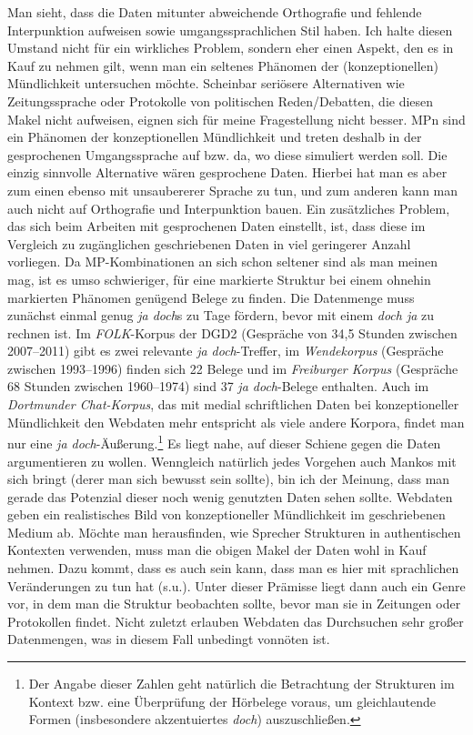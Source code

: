 Man sieht, dass die Daten mitunter abweichende Orthografie und fehlende Interpunktion aufweisen sowie umgangssprachlichen Stil haben. Ich halte diesen Umstand nicht für ein wirkliches Problem, sondern eher einen Aspekt, den es in Kauf zu nehmen gilt, wenn man ein seltenes Phänomen der (konzeptionellen) Mündlichkeit untersuchen möchte. Scheinbar \glq seriösere\grq {} Alternativen wie Zei\-tungssprache oder Protokolle von politischen Reden/Debatten, die diesen \glq Makel\grq {} nicht aufweisen, eignen sich für meine Fragestellung nicht besser. MPn sind ein Phäno\-men der konzeptionellen Mündlichkeit und treten deshalb in der gesprochenen Umgangs\-sprache auf bzw. da, wo diese simuliert werden soll. Die einzig sinn\-volle Alternative wären gesprochene Daten. Hierbei hat man es aber zum einen ebenso mit \glq unsaubererer\grq {} Sprache zu tun, und zum anderen kann man auch nicht auf Orthografie und Interpunktion bauen. Ein zusätzliches Problem, das sich beim Arbeiten mit gesprochenen Daten einstellt, ist, dass diese im Ver\-gleich zu zugängli\-chen geschriebenen Daten in viel geringerer Anzahl vorliegen. Da MP-Kombina\-tionen an sich schon seltener sind als man meinen mag, ist es umso schwieriger, für eine markierte Struktur bei einem ohnehin markierten Phänomen genügend Belege zu finden. Die Datenmenge muss zunächst einmal genug \textit{ja doch}s zu Tage fördern, bevor mit einem \textit{doch ja} zu rechnen ist. Im \textit{FOLK}-Korpus der DGD2 (Gespräche von 34,5 Stunden zwischen 2007–2011) gibt es zwei relevante \textit{ja doch}-Treffer, im \textit{Wendekorpus} (Gespräche zwischen 1993–1996) finden sich 22 Belege und im \textit{Freiburger Korpus} (Gespräche 68 Stunden zwischen 1960–1974) sind 37 \textit{ja doch}-Belege enthalten. Auch im \textit{Dortmunder Chat-Korpus}, das mit medial schriftlichen Daten bei konzeptioneller Mündlichkeit den Webdaten mehr entspricht als viele andere Korpora, findet man nur eine \textit{ja doch}-Äußerung.\footnote{Der Angabe dieser Zahlen geht natürlich die Betrachtung der Strukturen im Kontext bzw. eine Überprüfung der Hörbelege voraus, um gleichlautende Formen (insbesondere akzentuiertes \textit{doch}) auszuschließen.} Es liegt nahe, auf dieser Schiene gegen die Daten argumentieren zu wollen. Wenngleich natürlich jedes Vorgehen auch Mankos mit sich bringt (derer man sich bewusst sein sollte), bin ich der Meinung, dass man gerade das Potenzial dieser noch wenig genutzten Daten sehen sollte. Webdaten geben ein realistisches Bild von konzeptioneller Mündlichkeit  im geschriebenen Medium ab. Möchte man herausfinden, wie Spre\-cher Strukturen in authentischen Kontexten verwenden, muss man die obigen \glq Makel\grq {} der Daten wohl in Kauf nehmen. Dazu kommt, dass es auch sein kann, dass man es hier mit sprachlichen Veränderungen zu tun hat (s.u.). Unter dieser Prämisse liegt dann auch ein Genre vor, in dem man die Struktur beobachten sollte, bevor man sie in Zeitungen oder Protokollen findet. Nicht zuletzt erlauben Webdaten das Durchsuchen sehr großer Datenmengen, was in diesem Fall unbedingt vonnöten ist. 

